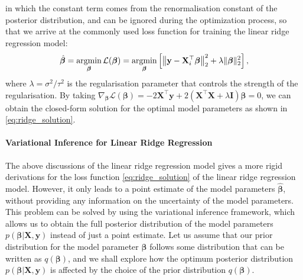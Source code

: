 in which the constant term comes from the renormalisation constant of the posterior distribution, and can be ignored during the optimization process, so that we arrive at the commonly used loss function for training the linear ridge regression model:
\begin{equation}\label{eq:linear_ridge_loss}
    \hat{\boldsymbol{\beta}} = \operatorname*{argmin}_{\boldsymbol{\beta}} \mathcal{L}(\boldsymbol{\beta}) = \operatorname*{argmin}_{\boldsymbol{\beta}} \left[\left\Vert \mathbf{y}-\mathbf{X}_i^\top\boldsymbol{\beta}\right\Vert_2^2 + \lambda\Vert\boldsymbol{\beta}\Vert_2^2 \right],       
\end{equation}
where $\lambda=\sigma^2/\tau^2$ is the regularisation parameter that controls the strength of the regularisation. By taking $\nabla_{\boldsymbol{\beta}}\mathcal{L}(\boldsymbol{\beta})=-2\bm{X}^\top\bm{y}+2(\bm{X}^\top\bm{X}+\lambda\bm{I})\boldsymbol{\beta}=0$, we can obtain the closed-form solution for the optimal model parameters as shown in \cref{eq:ridge_solution}. 

\paragraph{Variational Inference for Linear Ridge Regression}

The above discussions of the linear ridge regression model gives a more rigid derivations for the loss function \cref{eq:ridge_solution} of the linear ridge regression model. However, it only leads to a point estimate of the model parameters $\hat{\boldsymbol{\beta}}$, without providing any information on the uncertainty of the model parameters. This problem can be solved by using the variational inference framework, which allows us to obtain the full posterior distribution of the model parameters $p(\boldsymbol{\beta}|\bm{X},\bm{y})$ instead of just a point estimate. Let us assume that our prior distribution for the model parameter $\boldsymbol{\beta}$ follows some distribution that can be written as $q(\boldsymbol{\beta})$, and we shall explore how the optimum posterior distribution $p(\boldsymbol{\beta}|\bm{X},\bm{y})$ is affected by the choice of the prior distribution $q(\boldsymbol{\beta})$.

